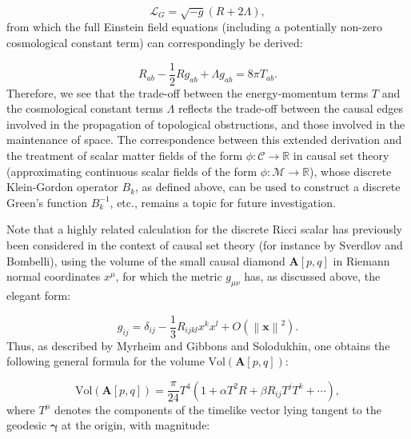 \documentclass{article}
\begin{document}
\begin{equation}
\mathcal{L}_G = \sqrt{-g} \left( R + 2 \Lambda \right),
\end{equation}
from which the full Einstein field equations (including a potentially non-zero cosmological constant term) can correspondingly be derived:

\begin{equation}
R_{a b} - \frac{1}{2} R g_{a b} + \Lambda g_{ a b} = 8 \pi T_{a b}.
\end{equation}
Therefore, we see that the trade-off between the energy-momentum terms $T$ and the cosmological constant terms ${\Lambda}$ reflects the trade-off between the causal edges involved in the propagation of topological obstructions, and those involved in the maintenance of space. The correspondence between this extended derivation and the treatment of scalar matter fields of the form ${\phi : \mathcal{C} \to \mathbb{R}}$ in causal set theory (approximating continuous scalar fields of the form ${\phi : \mathcal{M} \to \mathbb{R}}$), whose discrete Klein-Gordon operator ${B_{k}}$, as defined above, can be used to construct a discrete Green's function ${B_{k}^{-1}}$, etc., remains a topic for future investigation.

Note that a highly related calculation for the discrete Ricci scalar has previously been considered in the context of causal set theory (for instance by Sverdlov and Bombelli\cite{sverdlov}), using the volume of the small causal diamond ${\mathbf{A} \left[ p, q \right]}$ in Riemann normal coordinates ${x^{\mu}}$, for which the metric ${g_{\mu \nu}}$ has, as discussed above, the elegant form:

\begin{equation}
g_{i j} = \delta_{i j} - \frac{1}{3} R_{i j k l}  x^k x^l + O \left( \left\lVert \mathbf{x} \right\rVert^2 \right).
\end{equation}
Thus, as described by Myrheim\cite{myrheim} and Gibbons and Solodukhin\cite{gibbons}, one obtains the following general formula for the volume ${\mathrm{Vol} \left( \mathbf{A} \left[ p, q \right] \right)}$:

\begin{equation}
\mathrm{Vol} \left( \mathbf{A} \left[ p, q \right] \right) = \frac{\pi}{24} T^4 \left( 1 + \alpha T^2 R + \beta R_{i j} T^j T^k + \cdots \right),
\end{equation}
where ${T^{\mu}}$ denotes the components of the timelike vector lying tangent to the geodesic ${\mathbf{\gamma}}$ at the origin, with magnitude:
\end{document}
